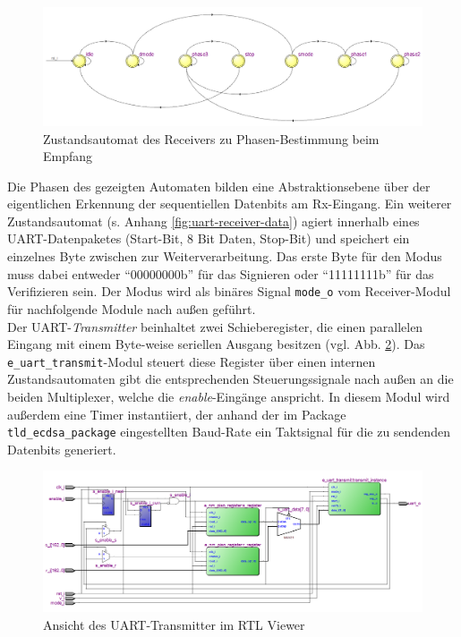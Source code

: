 \begin{figure}[thb]
	\centering
  	\includegraphics[width=\textwidth]{bilder/uart-receiver-phase}
	\caption{Zustandsautomat des Receivers zu Phasen-Bestimmung beim Empfang}
	\label{fig:uart-receiver-phase}
\end{figure}

Die Phasen des gezeigten Automaten bilden eine Abstraktionsebene über der eigentlichen Erkennung der sequentiellen Datenbits am Rx-Eingang. Ein weiterer Zustandsautomat (s. Anhang \ref{fig:uart-receiver-data}) agiert innerhalb eines UART-Datenpaketes (Start-Bit, 8 Bit Daten, Stop-Bit) und speichert ein einzelnes Byte zwischen zur Weiterverarbeitung. Das erste Byte für den Modus muss dabei entweder ``00000000b'' für das Signieren oder ``11111111b'' für das Verifizieren sein. Der Modus wird als binäres Signal \texttt{mode\_o} vom Receiver-Modul für nachfolgende Module nach außen geführt. \\

Der UART-\textit{Transmitter} beinhaltet zwei Schieberegister, die einen parallelen Eingang mit einem Byte-weise seriellen Ausgang besitzen (vgl. Abb. \ref{fig:uarttx}). Das \texttt{e\_uart\_transmit}-Modul steuert diese Register über einen internen Zustandsautomaten gibt die entsprechenden Steuerungssignale nach außen an die beiden Multiplexer, welche die \textit{enable}-Eingänge anspricht. In diesem Modul wird außerdem eine Timer instantiiert, der anhand der im Package \texttt{tld\_ecdsa\_package} eingestellten Baud-Rate ein Taktsignal für die zu sendenden Datenbits generiert.  \\

\begin{figure}[H]
	\centering
  	\includegraphics[width=\textwidth]{bilder/uart-transmitter}
	\caption{Ansicht des UART-Transmitter im RTL Viewer}
	\label{fig:uarttx}
\end{figure}

